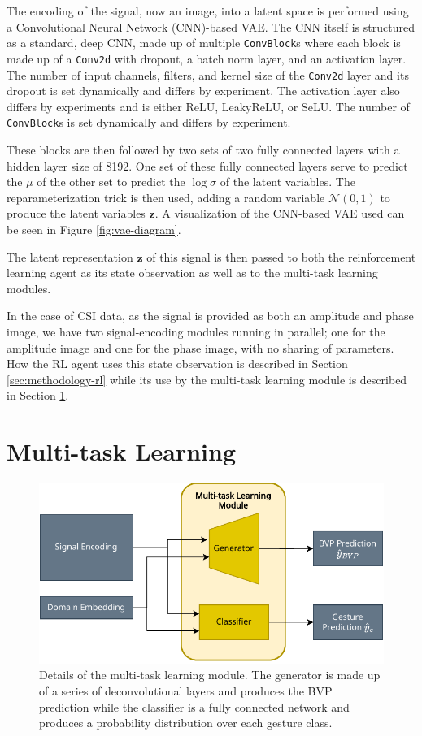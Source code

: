 The encoding of the signal, now an image, into a latent space is performed using a Convolutional Neural Network (CNN)-based VAE.
The CNN itself is structured as a standard, deep CNN, made up of multiple \verb|ConvBlock|s where each block is made up of a \verb|Conv2d| with dropout, a batch norm layer, and an activation layer.
The number of input channels, filters, and kernel size of the \verb|Conv2d| layer and its dropout is set dynamically and differs by experiment.
The activation layer also differs by experiments and is either ReLU, LeakyReLU, or SeLU.
The number of \verb|ConvBlock|s is set dynamically and differs by experiment.

These blocks are then followed by two sets of two fully connected layers with a hidden layer size of 8192.
One set of these fully connected layers serve to predict the $\mu$ of the other set to predict the $\log \sigma$ of the latent variables.
The reparameterization trick is then used, adding a random variable $\mathcal{N}(0, 1)$ to produce the latent variables $\boldsymbol{z}$.
A visualization of the CNN-based VAE used can be seen in Figure \ref{fig:vae-diagram}.

The latent representation $\boldsymbol{z}$ of this signal is then passed to both the reinforcement learning agent as its state observation as well as to the multi-task learning modules.

In the case of CSI data, as the signal is provided as both an amplitude and phase image, we have two signal-encoding modules running in parallel; one for the amplitude image and one for the phase image, with no sharing of parameters.
How the RL agent uses this state observation is described in Section \ref{sec:methodology-rl} while its use by the multi-task learning module is described in Section \ref{sec:methodology-multi-task-learning}.

\section{Multi-task Learning}\label{sec:methodology-multi-task-learning}

\begin{figure}
	\centering
	\includegraphics[width=0.8\linewidth]{figures/multitask_learning_module_diagram.pdf}
	\caption{Details of the multi-task learning module. The generator is made up of a series of deconvolutional layers and produces the BVP prediction while the classifier is a fully connected network and produces a probability distribution over each gesture class.}
	\label{fig:multitask-learning-module-diagram}
\end{figure}

